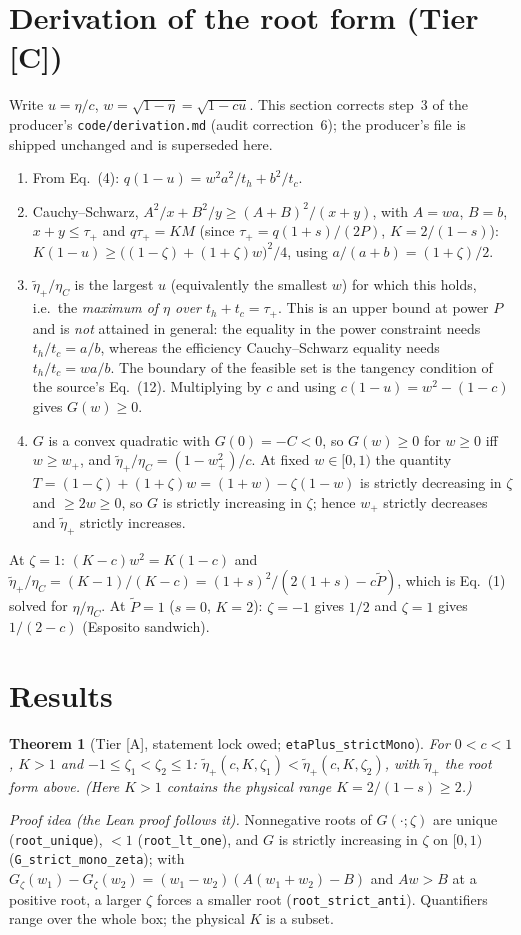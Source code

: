 \documentclass[10pt]{article}
\newcommand{\tier}[1]{\textsf{[#1]}}
\newcommand{\tA}{\tier{A}}
\newcommand{\tC}{\tier{C}}
\newcommand{\lean}[1]{\texttt{#1}}
\newcommand{\eC}{\eta_C}
\newcommand{\ep}{\tilde\eta_+}
\theoremstyle{plain}
\newtheorem{thm}{Theorem}
\begin{document}
\section{Derivation of the root form (Tier \tC{})}\label{sec:deriv}
Write $u=\eta/c$, $w=\sqrt{1-\eta}=\sqrt{1-cu}$. This section corrects step~3 of the producer's \texttt{code/derivation.md} (audit correction~6); the producer's file is shipped unchanged and is superseded here.
\begin{enumerate}\itemsep=1pt
\item From Eq.~(4): $q(1-u)=w^2a^2/t_h+b^2/t_c$.
\item Cauchy--Schwarz, $A^2/x+B^2/y\ge(A+B)^2/(x+y)$, with $A=wa$, $B=b$, $x+y\le\tau_+$ and $q\tau_+=KM$ (since $\tau_+=q(1+s)/(2P)$, $K=2/(1-s)$): $K(1-u)\ge\bigl((1-\zeta)+(1+\zeta)w\bigr)^2/4$, using $a/(a+b)=(1+\zeta)/2$.
\item $\ep/\eC$ is the largest $u$ (equivalently the smallest $w$) for which this holds, i.e.\ the \emph{maximum of $\eta$ over $t_h+t_c=\tau_+$}. This is an upper bound at power $P$ and is \emph{not} attained in general: the equality in the power constraint needs $t_h/t_c=a/b$, whereas the efficiency Cauchy--Schwarz equality needs $t_h/t_c=wa/b$. The boundary of the feasible set is the tangency condition of the source's Eq.~(12). Multiplying by $c$ and using $c(1-u)=w^2-(1-c)$ gives $G(w)\ge0$.
\item $G$ is a convex quadratic with $G(0)=-C<0$, so $G(w)\ge0$ for $w\ge0$ iff $w\ge w_+$, and $\ep/\eC=(1-w_+^2)/c$. At fixed $w\in[0,1)$ the quantity $T=(1-\zeta)+(1+\zeta)w=(1+w)-\zeta(1-w)$ is strictly decreasing in $\zeta$ and $\ge 2w\ge0$, so $G$ is strictly increasing in $\zeta$; hence $w_+$ strictly decreases and $\ep$ strictly increases.
\end{enumerate}
At $\zeta=1$: $(K-c)w^2=K(1-c)$ and $\ep/\eC=(K-1)/(K-c)=(1+s)^2/(2(1+s)-c\tilde P)$, which is Eq.~(1) solved for $\eta/\eC$. At $\tilde P=1$ ($s=0$, $K=2$): $\zeta=-1$ gives $1/2$ and $\zeta=1$ gives $1/(2-c)$ (Esposito sandwich).

\section{Results}\label{sec:results}
\begin{thm}[Tier \tA{}, statement lock owed; \lean{etaPlus\_strictMono}]\label{thm:mono}
For $0<c<1$, $K>1$ and $-1\le\zeta_1<\zeta_2\le1$: $\ep(c,K,\zeta_1)<\ep(c,K,\zeta_2)$, with $\ep$ the root form above. (Here $K>1$ contains the physical range $K=2/(1-s)\ge2$.)
\end{thm}
\noindent\emph{Proof idea (the Lean proof follows it).} Nonnegative roots of $G(\cdot;\zeta)$ are unique (\lean{root\_unique}), $<1$ (\lean{root\_lt\_one}), and $G$ is strictly increasing in $\zeta$ on $[0,1)$ (\lean{G\_strict\_mono\_zeta}); with $G_{\zeta}(w_1)-G_{\zeta}(w_2)=(w_1-w_2)(A(w_1+w_2)-B)$ and $A w>B$ at a positive root, a larger $\zeta$ forces a smaller root (\lean{root\_strict\_anti}). Quantifiers range over the whole box; the physical $K$ is a subset.
\end{document}

